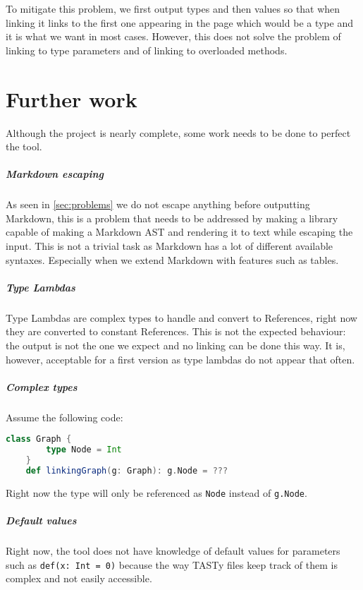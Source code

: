 \documentclass{report}
\begin{document}
To mitigate this problem, we first output types and then values so that when linking it links to the first one appearing in the page which would be a type and it is what we want in most cases. However, this does not solve the problem of linking to type parameters and of linking to overloaded methods.

\chapter{Further work}
Although the project is nearly complete, some work needs to be done to perfect the tool.

\paragraph{Markdown escaping}
As seen in \autoref{sec:problems} we do not escape anything before outputting Markdown, this is a problem that needs to be addressed by making a library capable of making a Markdown AST and rendering it to text while escaping the input. This is not a trivial task as Markdown has a lot of different available syntaxes. Especially when we extend Markdown with features such as tables.

\paragraph{Type Lambdas}
Type Lambdas are complex types to handle and convert to References, right now they are converted to constant References. This is not the expected behaviour: the output is not the one we expect and no linking can be done this way. It is, however, acceptable for a first version as type lambdas do not appear that often.

\paragraph{Complex types}
Assume the following code:
\begin{lstlisting}[language=scala]
    class Graph {
        type Node = Int
    }
    def linkingGraph(g: Graph): g.Node = ???    
\end{lstlisting}
Right now the type will only be referenced as \texttt{Node} instead of \texttt{g.Node}.

\paragraph{Default values}
Right now, the tool does not have knowledge of default values for parameters such as \texttt{def(x: Int = 0)} because the way TASTy files keep track of them is complex and not easily accessible.
\end{document}
